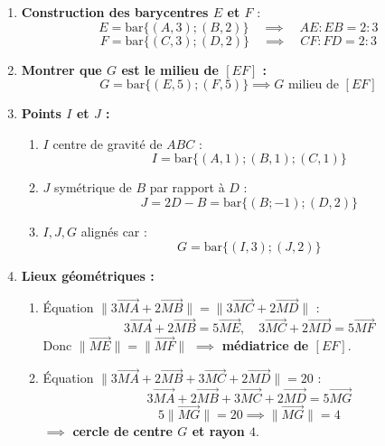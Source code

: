 \documentclass[12pt,a4paper]{article}
\begin{document}
\begin{enumerate}
    \item \textbf{Construction des barycentres $E$ et $F$} :
    \[
    E = \mathrm{bar}\{(A,3);(B,2)\} \quad \implies \quad AE : EB = 2:3
    \]
    \[
    F = \mathrm{bar}\{(C,3);(D,2)\} \quad \implies \quad CF : FD = 2:3
    \]
    
    \item \textbf{Montrer que $G$ est le milieu de $[EF]$ :}
    \[
    G = \mathrm{bar}\{(E,5);(F,5)\} \implies G \text{ milieu de } [EF]
    \]
    
    \item \textbf{Points $I$ et $J$ :}
    \begin{enumerate}
        \item $I$ centre de gravité de $ABC$ :
        \[
        I = \mathrm{bar}\{(A,1);(B,1);(C,1)\}
        \]
        \item $J$ symétrique de $B$ par rapport à $D$ :
        \[
        J = 2D - B = \mathrm{bar}\{(B;-1);(D,2)\}
        \]
        \item $I, J, G$ alignés car :
        \[
        G = \mathrm{bar}\{(I,3);(J,2)\}
        \]
    \end{enumerate}
    
    \item \textbf{Lieux géométriques :}
    \begin{enumerate}
        \item Équation $\|3\overrightarrow{MA} + 2\overrightarrow{MB}\| = \|3\overrightarrow{MC} + 2\overrightarrow{MD}\|$ :
        \[
        3\overrightarrow{MA} + 2\overrightarrow{MB} = 5\overrightarrow{ME}, \quad 3\overrightarrow{MC} + 2\overrightarrow{MD} = 5\overrightarrow{MF}
        \]
        Donc $\|\overrightarrow{ME}\| = \|\overrightarrow{MF}\|$  
        $\implies$ \textbf{médiatrice de $[EF]$}.
        
        \item Équation $\|3\overrightarrow{MA} + 2\overrightarrow{MB} + 3\overrightarrow{MC} + 2\overrightarrow{MD}\| = 20$ :
        \[
        3\overrightarrow{MA} + 2\overrightarrow{MB} + 3\overrightarrow{MC} + 2\overrightarrow{MD} = 5 \overrightarrow{MG}
        \]
        \[
        5 \|\overrightarrow{MG}\| = 20 \implies \|\overrightarrow{MG}\| = 4
        \]
        $\implies$ \textbf{cercle de centre $G$ et rayon $4$}.
    \end{enumerate}
\end{enumerate}
\end{document}
